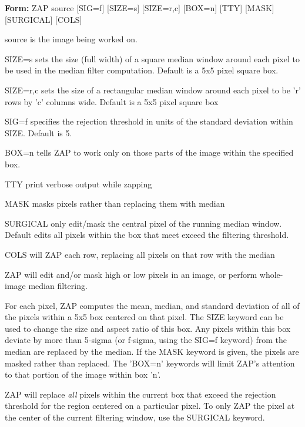 \begin{command}
  \item[\textbf{Form: }ZAP source {[SIG=f]} {[SIZE=s]} {[SIZE=r,c]} 
       {[BOX=n]} {[TTY]} {[MASK]} {[SURGICAL]} {[COLS]} \hfill]{}
  \item[source]{is the} image being worked on.
  \item[SIZE=s]{sets the size (full width) of a square median
       window around each pixel to be used in the median filter
       computation.  Default is a 5x5 pixel square box.}
  \item[SIZE=r,c]{sets the size of a rectangular median window
       around each pixel to be 'r' rows by 'c' columns wide.  Default
       is a 5x5 pixel square box}
  \item[SIG=f]{specifies the rejection threshold in units
       of the standard deviation within SIZE.  Default is 5}.
  \item[BOX=n]{tells ZAP to work only on those parts of the image
       within the specified box}.
  \item[TTY]{print verbose output while zapping}
  \item[MASK]{masks pixels rather than replacing them with median}
  \item[SURGICAL]{only edit/mask the central pixel of the running
       median window.  Default edits all pixels within the box that
       meet exceed the filtering threshold.}
  \item[COLS]{will ZAP each row, replacing all pixels on that row with the median}
\end{command}

ZAP will edit and/or mask high or low pixels in an image, or perform
whole-image median filtering.  

For each pixel, ZAP computes the mean, median, and standard deviation of
all of the pixels within a 5x5 box centered on that pixel.  The SIZE
keyword can be used to change the size and aspect ratio of this box.  Any
pixels within this box deviate by more than 5-sigma (or f-sigma, using the
SIG=f keyword) from the median are replaced by the median.  If the MASK
keyword is given, the pixels are masked rather than replaced.  The 'BOX=n'
keywords will limit ZAP's attention to that portion of the image within box
'n'.

ZAP will replace \textit{all} pixels within the current box that exceed the
rejection threshold for the region centered on a particular pixel.  To only
ZAP the pixel at the center of the current filtering window, use the
SURGICAL keyword.

